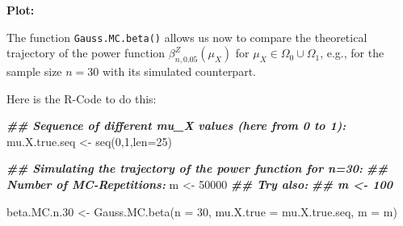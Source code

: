 \documentclass[
]{book}
\newenvironment{Shaded}{\begin{snugshade}}{\end{snugshade}}
\newcommand{\AttributeTok}[1]{\textcolor[rgb]{0.77,0.63,0.00}{#1}}
\newcommand{\DecValTok}[1]{\textcolor[rgb]{0.00,0.00,0.81}{#1}}
\newcommand{\DocumentationTok}[1]{\textcolor[rgb]{0.56,0.35,0.01}{\textbf{\textit{#1}}}}
\newcommand{\FloatTok}[1]{\textcolor[rgb]{0.00,0.00,0.81}{#1}}
\newcommand{\FunctionTok}[1]{\textcolor[rgb]{0.00,0.00,0.00}{#1}}
\newcommand{\NormalTok}[1]{#1}
\newcommand{\OtherTok}[1]{\textcolor[rgb]{0.56,0.35,0.01}{#1}}
\begin{document}
\textbf{Plot:}

The function \texttt{Gauss.MC.beta()} allows us now to compare the theoretical trajectory of the power function
\(\beta^{Z}_{n,0.05}(\mu_X)\) for \(\mu_X\in\Omega_0\cup\Omega_1\), e.g., for the sample size \(n=30\) with its simulated counterpart.

Here is the R-Code to do this:

\begin{Shaded}
\begin{Highlighting}[]
\DocumentationTok{\#\# Sequence of different mu\_X values (here from 0 to 1):}
\NormalTok{mu.X.true.seq   }\OtherTok{\textless{}{-}} \FunctionTok{seq}\NormalTok{(}\DecValTok{0}\NormalTok{,}\DecValTok{1}\NormalTok{,}\AttributeTok{len=}\DecValTok{25}\NormalTok{)}

\DocumentationTok{\#\# Simulating the trajectory of the power function for n=30:}
\DocumentationTok{\#\# Number of MC{-}Repetitions:}
\NormalTok{m }\OtherTok{\textless{}{-}} \DecValTok{50000}  
\DocumentationTok{\#\# Try also: }
\DocumentationTok{\#\# m \textless{}{-} 100}

\NormalTok{beta.MC.n}\FloatTok{.30}       \OtherTok{\textless{}{-}} \FunctionTok{Gauss.MC.beta}\NormalTok{(}\AttributeTok{n         =} \DecValTok{30}\NormalTok{, }
                                    \AttributeTok{mu.X.true =}\NormalTok{ mu.X.true.seq,}
                                    \AttributeTok{m         =}\NormalTok{ m)}


\end{Highlighting}
\end{Shaded}
\end{document}
